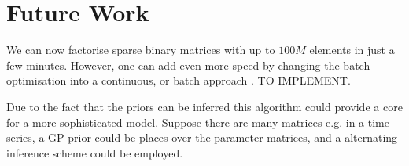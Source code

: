 \documentclass{article}
\begin{document}
\section{Future Work}\label{sec:future}

We can now factorise sparse binary matrices with up to $100M$ elements in just a few minutes.
However, one can add even more speed by changing the batch optimisation into a 
continuous, or batch approach \citep{hoffman2010}. TO IMPLEMENT.

Due to the fact that the priors can be inferred this algorithm could provide a core 
for a more sophisticated model. Suppose there are many matrices e.g. in a time series,
a GP prior could be places over the parameter matrices, and a alternating inference scheme 
could be employed.

\newpage
{


}
\end{document}
